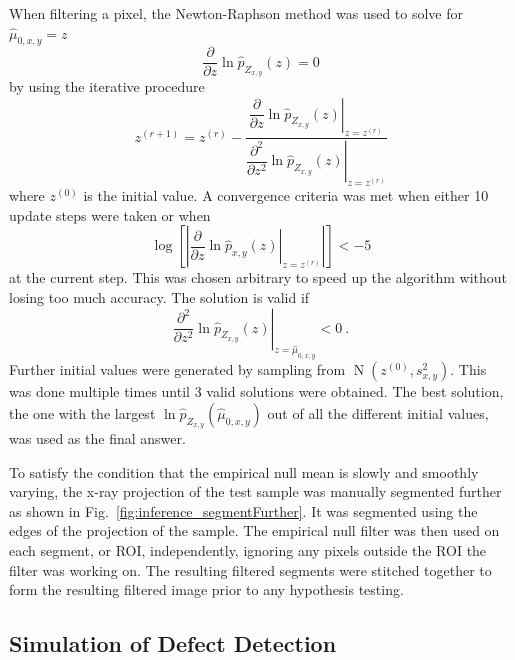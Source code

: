 \documentclass{article}
\DeclareMathOperator{\normal}{N}
\begin{document}
When filtering a pixel, the Newton-Raphson method was used to solve for $\widehat{\mu}_{0,x,y}=z$
\begin{equation}
  \dfrac{\partial}{\partial z}\ln\widehat{p}_{Z_{x,y}}(z) = 0
\end{equation}
by using the iterative procedure
\begin{equation}
  z^{(r+1)} =
  z^{(r)}
  -\dfrac{
    \left.
      \dfrac{
        \partial
      }
      {
        \partial z
      }
      \ln\widehat{p}_{Z_{x,y}}(z)
    \right|_{z = z^{(r)}}
  }
  {
    \left.
      \dfrac{
        \partial^2
      }
      {
        \partial z^2
      }
      \ln\widehat{p}_{Z_{x,y}}(z)
    \right|_{z = z^{(r)}}
  }
\end{equation}
where $z^{(0)}$ is the initial value. A convergence criteria was met when either 10 update steps were taken or when
\begin{equation}
  \log\left[\left|
    \left.
    \dfrac{
      \partial
    }
    {
      \partial z
    }
  \ln\widehat{p}_{x,y}(z)
  \right|_{z=z^{(r)}}
  \right|\right]
  <-5
\end{equation}
at the current step. This was chosen arbitrary to speed up the algorithm without losing too much accuracy. The solution is valid if
\begin{equation}
  \left.
    \dfrac{
      \partial^2
    }
    {
      \partial z^2
    }
    \ln\widehat{p}_{Z_{x,y}}(z)
  \right|_{z=\widehat{\mu}_{0,x,y}}
  < 0 \ .
\end{equation}
Further initial values were generated by sampling from $\normal(z^{(0)}, s_{x,y}^2)$. This was done multiple times until 3 valid solutions were obtained. The best solution, the one with the largest $\ln\widehat{p}_{Z_{x,y}}\left(\widehat{\mu}_{0,x,y}\right)$ out of all the different initial values, was used as the final answer.

To satisfy the condition that the empirical null mean is slowly and smoothly varying, the x-ray projection of the test sample was manually segmented further as shown in Fig.~\ref{fig:inference_segmentFurther}. It was segmented using the edges of the projection of the sample. The empirical null filter was then used on each segment, or ROI, independently, ignoring any pixels outside the ROI the filter was working on. The resulting filtered segments were stitched together to form the resulting filtered image prior to any hypothesis testing.

\subsection{Simulation of Defect Detection}
\label{subsection:simulation}
\end{document}
